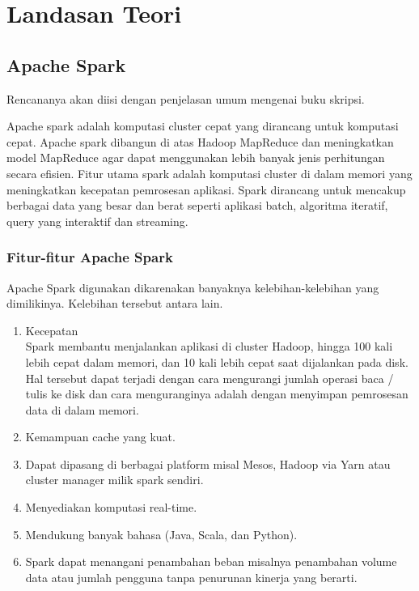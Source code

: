 \chapter{Landasan Teori}
\label{chap:teori}

\section{Apache Spark}
\label{sec:spark} 
 
Rencananya akan diisi dengan penjelasan umum mengenai buku skripsi.

Apache spark adalah komputasi cluster cepat yang dirancang untuk komputasi cepat. Apache spark dibangun di atas Hadoop MapReduce dan meningkatkan model MapReduce agar dapat menggunakan lebih banyak jenis perhitungan secara efisien. Fitur utama spark adalah komputasi cluster di dalam memori yang meningkatkan kecepatan pemrosesan aplikasi. Spark dirancang untuk mencakup berbagai data yang besar dan berat seperti aplikasi batch, algoritma iteratif, query yang interaktif dan streaming.

\subsection{Fitur-fitur Apache Spark}
Apache Spark digunakan dikarenakan banyaknya kelebihan-kelebihan yang dimilikinya. Kelebihan tersebut antara lain.
\begin{enumerate}
\item Kecepatan\\
Spark membantu menjalankan aplikasi di cluster Hadoop, hingga 100 kali lebih cepat dalam memori, dan 10 kali lebih cepat saat dijalankan pada disk. Hal tersebut dapat terjadi dengan cara mengurangi jumlah operasi baca / tulis ke disk dan cara menguranginya adalah dengan menyimpan pemrosesan data di dalam memori.
\item Kemampuan cache yang kuat.
\item Dapat dipasang di berbagai platform misal Mesos, Hadoop via Yarn atau cluster manager milik spark sendiri.
\item Menyediakan komputasi real-time.
\item Mendukung banyak bahasa (Java, Scala, dan Python).
\item Spark dapat menangani penambahan beban misalnya penambahan volume data atau jumlah pengguna tanpa penurunan kinerja yang berarti.
\end{enumerate}

